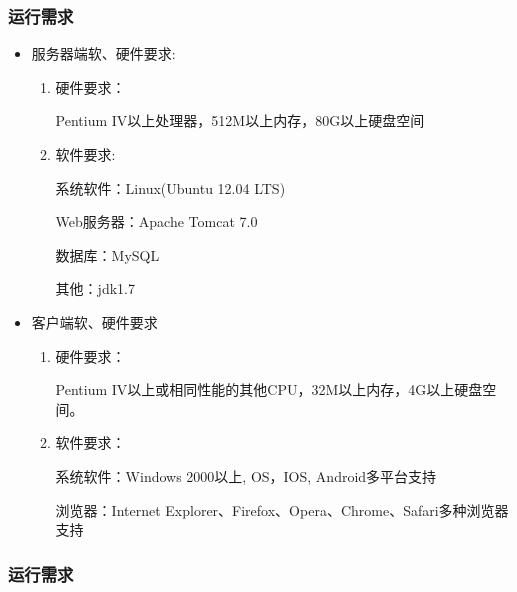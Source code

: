 \documentclass[12pt,a4paper]{article}
\begin{document}
		\subsubsection{运行需求}
\begin{itemize}
	\item
	服务器端软、硬件要求:
	\begin{enumerate}
	\item
	硬件要求：
	
	Pentium IV以上处理器，512M以上内存，80G以上硬盘空间
	
	\item
	软件要求:
	
	系统软件：Linux(Ubuntu 12.04 LTS)
	
	Web服务器：Apache Tomcat 7.0
	
	数据库：MySQL
	
	其他：jdk1.7
	\end{enumerate}
	
	\item
	客户端软、硬件要求
	\begin{enumerate}
	\item
	硬件要求：
	
	Pentium IV以上或相同性能的其他CPU，32M以上内存，4G以上硬盘空间。
	
	\item
	软件要求：
	
	系统软件：Windows 2000以上, OS，IOS, Android多平台支持
	
	浏览器：Internet Explorer、Firefox、Opera、Chrome、Safari多种浏览器支持
	\end{enumerate}
	
\end{itemize}
		
		\subsubsection{运行需求}	
		
\end{document}
